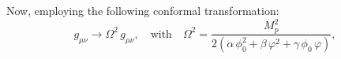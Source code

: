 \documentclass[aps,prd,reprint,preprintnumbers,showpacs,floatfix,nofootinbib,superscript address]{revtex4-2}
\begin{document}

Now, employing the following conformal transformation: 
\begin{equation}
    g_{\mu\nu}\rightarrow \Omega^2\,g_{\mu\nu},\quad\text{with}\quad \Omega^2 = \frac{M_p^2}{2(\alpha\,\phi_0^2+\beta\,\varphi^2+\gamma\,\phi_0\,\varphi)},
\end{equation}
\end{document}
